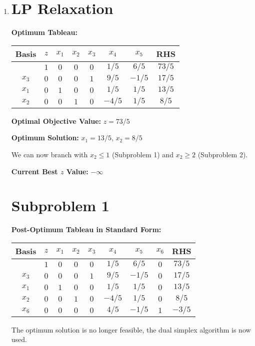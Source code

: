 \documentclass{article}[12pt,a4paper]
\begin{document}
\begin{enumerate}
	   \item \section*{LP Relaxation}
	   \textbf{Optimum Tableau:}
	   \begin{center}
 	   \begin{tabular}{c | c | c c c c c | c}
            		Basis & $z$ & $x_1$ & $x_2$ & $x_3$ & $x_4$ & $x_5$ & RHS \\ \hline
  			           & $1$ & $0$ & $0$   & $0$ & $1/5$     & $6/5$               & $73/5$  \\ \hline
  			$x_3$ & $0$ & $0$ & $0$   & $1$    & $9/5$  & $-1/5$         & $17/5$ \\
  			$x_1$ & $0$ & $1$ & $0$  &  $0$    & $1/5$  & $1/5$         & $13/5$ \\
  			$x_2$ & $0$ & $0$ & $1$ &   $0$    & $-4/5$ & $1/5$         & $8/5$ \\
  	  \end{tabular}
  	  \end{center}
  	  \textbf{Optimal Objective Value:} $z = 73/5$
  	  
  	  \noindent \textbf{Optimum Solution:} $x_1 = 13/5$, $x_2 = 8/5$
  	  
  	  \noindent We can now branch with $x_2 \le 1$ (Subproblem 1) and $x_2 \ge 2$ (Subproblem 2).
  	  
  	  \textbf{Current Best $z$ Value:} $-\infty$
  	  
  	  \section*{Subproblem 1}
  	  \textbf{Post-Optimum Tableau in Standard Form:}
  	  \begin{center}
 	   \begin{tabular}{c | c | c c c c c c | c}
            		Basis & $z$ & $x_1$ & $x_2$ & $x_3$ & $x_4$ & $x_5$ & $x_6$ & RHS \\ \hline
  			           & $1$ & $0$ & $0$   & $0$ & $1/5$     & $6/5$ & $0$ & $73/5$  \\ \hline
  			$x_3$ & $0$ & $0$ & $0$   & $1$    & $9/5$  & $-1/5$ & $0$ & $17/5$ \\
  			$x_1$ & $0$ & $1$ & $0$  &  $0$    & $1/5$  & $1/5$ & $0$ & $13/5$ \\
  			$x_2$ & $0$ & $0$ & $1$ &   $0$    & $-4/5$ & $1/5$ & $0$ & $8/5$ \\
  			$x_6$ & $0$ & $0$ & $0$ &   $0$    & $4/5$ & $-1/5$ & $1$ & $-3/5$ \\
  	  \end{tabular}
  	  \end{center}
  	  The optimum solution is no longer feasible, the dual simplex algorithm is now used. 
  	  

\end{enumerate}
\end{document}
